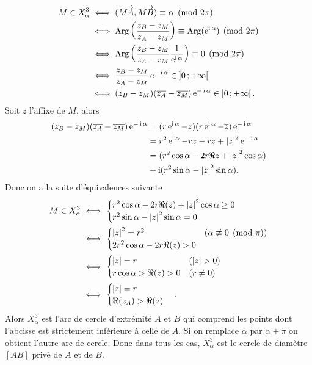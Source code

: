 \begin{align}
  M \in X_{\alpha}^3 & \iff (\overrightarrow{MA},\overrightarrow{MB}) \equiv \alpha \pmod {2\pi} \\
& \iff \operatorname{Arg}\left(\frac{z_B-z_M}{z_A-z_M}\right) \equiv \operatorname{Arg}(\operatorname{e}^{\operatorname{i} \alpha}) \pmod {2\pi}\\
& \iff \operatorname{Arg}\left(\frac{z_B-z_M}{z_A-z_M} \frac{1}{\operatorname{e}^{\operatorname{i} \alpha}}\right) \equiv 0 \pmod {2\pi}\\
& \iff \frac{z_B-z_M}{z_A-z_M} \operatorname{e}^{-\operatorname{i} \alpha} \in \left] 0 \, ;  +\infty \right[\\
& \iff (z_B-z_M)(\overline{z_A}-\overline{z_M})\operatorname{e}^{-\operatorname{i} \alpha} \in \left] 0 \, ;  +\infty \right[.
\end{align}
Soit $z$ l'affixe de $M$, alors
\begin{align}
  (z_B-z_M)(\overline{z_A}-\overline{z_M})\operatorname{e}^{-\operatorname{i} \alpha} & = (r\operatorname{e}^{\operatorname{i} \alpha} - z)(r\operatorname{e}^{\operatorname{i} \alpha} - \overline{z})\operatorname{e}^{-\operatorname{i} \alpha}\\
&=r^2 \operatorname{e}^{\operatorname{i} \alpha} -rz-r\overline{z}+\left\lvert z\right\rvert^2\operatorname{e}^{-\operatorname{i} \alpha}\\
&=(r^2\cos \alpha - 2r\Re{z}+\left\lvert z\right\rvert^2\cos \alpha) \\ 
&+ \operatorname{i}(r^2\sin \alpha - \left\lvert z\right\rvert^2\sin \alpha).
\end{align}
Donc on a la suite d'équivalences suivante
\begin{align}
  M \in X_{\alpha}^3 & \iff \begin{cases} r^2\cos \alpha - 2r\Re(z)+\left\lvert z\right\rvert^2\cos \alpha \geq 0 \\ r^2\sin \alpha - \left\lvert z\right\rvert^2\sin \alpha  = 0\end{cases}\\
& \iff \begin{cases}\left\lvert z\right\rvert^2=r^2 & (\alpha \not\equiv 0 \pmod {\pi}) \\ 2r^2\cos \alpha - 2r \Re(z)>0&\end{cases}\\
& \iff \begin{cases}\left\lvert z\right\rvert=r & (\left\lvert z\right\rvert>0)\\ r\cos \alpha > \Re(z)>0& (r\neq 0)\end{cases}\\
& \iff \begin{cases}\left\lvert z\right\rvert=r \\ \Re(z_A) > \Re(z)\end{cases}.
\end{align}
Alors $X_{\alpha}^{3}$ est l'arc de cercle d'extrémité $A$ et $B$ qui comprend les points dont l'abcisse est strictement inférieure à celle de $A$. Si on remplace $\alpha$ par $\alpha+\pi$ on obtient l'autre arc de cercle. Donc dans tous les cas, $X_{\alpha}^3$ est le cercle de diamètre $[AB]$ privé de $A$ et de $B$.

